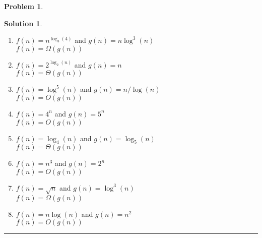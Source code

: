\documentclass{article}
\theoremstyle{definition}
\newtheorem{problem}{Problem}
\def\fline{\rule{0.75\linewidth}{0.5pt}}
\newcommand{\finishline}{\begin{center}\fline\end{center}}
\newtheorem*{solution*}{Solution}
\newenvironment{solution}{\begin{solution*}}{{\finishline} \end{solution*}}
\begin{document}
\begin{problem}
\begin{enumerate}
\begin{solution}
\begin{enumerate}[label=(\alph*)]
		\item $f(n) = n^{\log_3(4)}$ and $g(n) = n \log^3 (n)$ \\
		$f(n) = \Omega(g(n))$
		
		\item $f(n) = 2^{\log_2 (n)}$ and $g(n) = n$ \\
		$f(n) = \Theta(g(n))$
		
		\item $f(n) = \log^5 (n)$ and $g(n) = n/ \log(n)$ \\
		$f(n) = O(g(n))$
		
		\item $f(n) = 4^n$ and $g(n) = 5^n$ \\
		$f(n) = O(g(n))$
		
		\item $f(n) = \log_4 (n)$ and $g(n) = \log_5 (n)$ \\
		$f(n) = \Theta(g(n))$
		
		\item $f(n) = n^3$ and $g(n) = 2^n$ \\
		$f(n) = O(g(n))$
		
		\item $f(n) = \sqrt{n}$ and $g(n) = \log^3 (n)$ \\
		$f(n) = \Omega(g(n))$
		
		\item $f(n) = n \log(n)$ and $g(n) = n^2$ \\
		$f(n) = O(g(n))$
	    \end{enumerate} 
	\end{solution}

\end{enumerate}


\end{problem}


\smallskip
\end{document}
